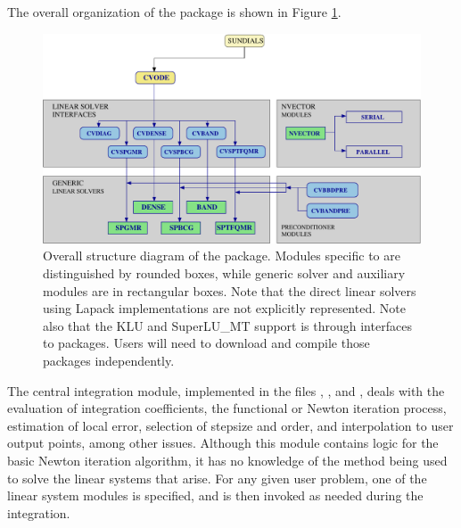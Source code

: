 The overall organization of the {\cvode} package is shown in Figure
\ref{f:cvorg}. 
\begin{figure}[!ht]
{\centerline{\includegraphics[width=\textwidth]{cvorg}}}
\caption [Overall structure diagram of the {\cvode} package]
{Overall structure diagram of the {\cvode} package.
  Modules specific to {\cvode} are distinguished by rounded boxes, while 
  generic solver and auxiliary modules are in rectangular boxes. 
  Note that the direct linear solvers using Lapack implementations are not 
  explicitly represented.
  Note also that the KLU and SuperLU\_MT support 
  is through interfaces
  to packages.  Users will need to download and compile those packages independently.}
\label{f:cvorg}
\end{figure}
The central integration module, implemented in the files ,
, and , deals with the evaluation of integration
coefficients, the functional or Newton iteration process, estimation of local
error, selection of stepsize and order, and interpolation to user output
points, among other issues.  Although this module contains logic for
the basic Newton iteration algorithm, it has no knowledge of the
method being used to solve the linear systems that arise.  For any
given user problem, one of the linear system modules is specified, and
is then invoked as needed during the integration. 

